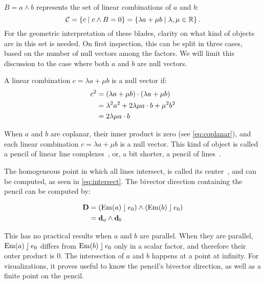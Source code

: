 $B = a \wedge b$ represents the set of linear combinations of $a$ and $b$:
\begin{equation*}
  \mathcal{C} = \left\{ c \mid c \wedge B = 0 \right\} = \left\{ \lambda a + \mu b \mid \lambda, \mu \in \mathbb{R} \right\} .
\end{equation*}
For the geometric interpretation of these blades, clarity on what kind of objects are in this set is needed.  On first inspection, this can be split in three cases, based on the number of null vectors among the factors.  We will limit this discussion to the case where both $a$ and $b$ are null vectors.

A linear combination $c = \lambda a + \mu b$ is a null vector if:
\begin{align}
  \label{eq:lincombnull}
  c^2 &= (\lambda a + \mu b) \mathbin{\cdot} (\lambda a + \mu b) \nonumber \\
  &= \lambda^2 a^2 + 2 \lambda \mu a \mathbin{\cdot} b + \mu^2 b^2 \nonumber \\
  &= 2 \lambda \mu a \mathbin{\cdot} b
\end{align}

When $a$ and $b$ are coplanar, their inner product is zero (see \autoref{eq:coplanar}), and each linear combination $c = \lambda a + \mu b$ is a null vector.  This kind of object is called a pencil of linear line complexes~\cite[Section 3.2.1]{Pottmann}, or, a bit shorter, a pencil of lines~\cite{Hongbo}.

The homogeneous point in which all lines intersect, is called its center~\cite{Hongbo}, and can be computed, as seen in \autoref{eq:intersect}.  The bivector direction containing the pencil can be computed by:

\begin{align*}
  \mathbf{D} &= \left(\operatorname{Em}(a) \mathbin{\rfloor} e_0 \right) \wedge \left(\operatorname{Em}(b) \mathbin{\rfloor} e_0\right) \\
  &= \mathbf{d}_a \wedge \mathbf{d}_b 
\end{align*}

This has no practical results when $a$ and $b$ are parallel.  When they are parallel, $\operatorname{Em}(a) \mathbin{\rfloor} e_0$ differs from $\operatorname{Em}(b) \mathbin{\rfloor} e_0$ only in a scalar factor, and therefore their outer product is $0$.  The intersection of $a$ and $b$ happens at a point at infinity.  For visualizations, it proves useful to know the pencil's bivector direction, as well as a finite point on the pencil.  

